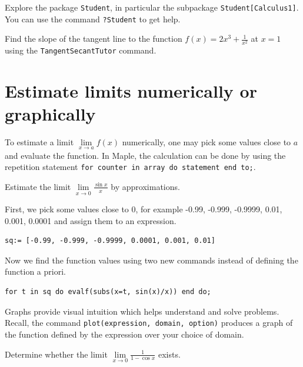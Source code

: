 \documentclass[]{book}
\theoremstyle{definition}
\theoremstyle{definition}
\theoremstyle{definition}
\theoremstyle{remark}
\let\BeginKnitrBlock\begin \let\EndKnitrBlock\end
\begin{document}
\BeginKnitrBlock{exercise}
\protect\hypertarget{exr:unnamed-chunk-3}{}{\label{exr:unnamed-chunk-3} }Explore the package \texttt{Student}, in particular the subpackage \texttt{Student{[}Calculus1{]}}.
You can use the command \texttt{?Student} to get help.

Find the slope of the tangent line to the function \(f(x)=2x^3+\frac1{x^2}\) at \(x=1\) using the \texttt{TangentSecantTutor} command.
\EndKnitrBlock{exercise}

\hypertarget{estimate-limits-numerically-or-graphically}{%
\section{Estimate limits numerically or graphically}\label{estimate-limits-numerically-or-graphically}}

To estimate a limit \(\lim\limits_{x\to a}f(x)\) numerically, one may pick some values close to \(a\) and evaluate the function. In Maple, the calculation can be done by using the repetition statement \texttt{for\ counter\ in\ array\ do\ statement\ end\ to;}.

\BeginKnitrBlock{example}
\protect\hypertarget{exm:unnamed-chunk-4}{}{\label{exm:unnamed-chunk-4} }Estimate the limit \(\lim\limits_{x\to 0}\frac{\sin x}{x}\) by approximations.
\EndKnitrBlock{example}

\BeginKnitrBlock{solution}
{}First, we pick some values close to 0, for example -0.99, -0.999, -0.9999, 0.01, 0.001, 0.0001 and assign them to an expression.

\begin{verbatim}
sq:= [-0.99, -0.999, -0.9999, 0.0001, 0.001, 0.01]
\end{verbatim}

Now we find the function values using two new commands instead of defining the function a priori.

\begin{verbatim}
for t in sq do evalf(subs(x=t, sin(x)/x)) end do;
\end{verbatim}
\EndKnitrBlock{solution}

Graphs provide visual intuition which helps understand and solve problems. Recall, the command \texttt{plot(expression,\ domain,\ option)} produces a graph of the function defined by the expression over your choice of domain.

\BeginKnitrBlock{example}
\protect\hypertarget{exm:unnamed-chunk-6}{}{\label{exm:unnamed-chunk-6} }Determine whether the limit \(\lim\limits_{x\to 0}\frac{1}{1- \cos x}\) exists.
\EndKnitrBlock{example}
\end{document}
